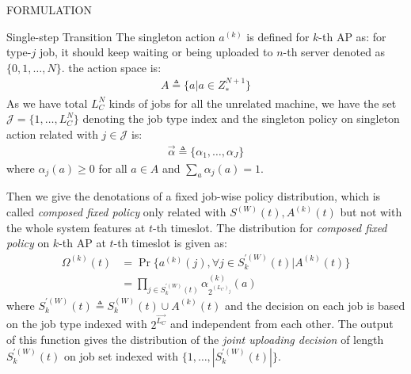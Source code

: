 \documentclass[10pt, conference, letterpaper]{IEEEtran}
\begin{document}
\begin{section}{FORMULATION}
\begin{subsection}{Single-step Transition}
            The singleton action $a^{(k)}$ is defined for $k$-th AP as: for type-$j$ job, it should keep waiting or being uploaded to $n$-th server denoted as $\{0,1,\dots,N\}$. the action space is:
            \begin{align}
                A \triangleq \{a|a \in Z_*^{N+1}\}
            \end{align}
            As we have total $L_C^{N}$ kinds of jobs for all the unrelated machine, we have the set $\mathcal{J}=\{1, \dots, L_C^{N}\}$ denoting the job type index and the singleton policy on singleton action related with $j \in \mathcal{J}$ is:
            \begin{align}
                \vec{\alpha} \triangleq \{\alpha_1,\dots,\alpha_J\}
            \end{align}
            where $\alpha_j(a) \geq 0$ for all $a \in A$ and $\sum_a \alpha_j(a) = 1$.

            Then we give the denotations of a fixed job-wise policy distribution, which is called \emph{composed fixed policy} only related with $S^{(W)}(t), A^{(k)}(t)$ but not with the whole system features at $t$-th timeslot. The distribution for \emph{composed fixed policy} on $k$-th AP at $t$-th timeslot is given as:
            \begin{align}
                \Omega^{(k)}(t) &= \Pr\{a^{(k)}(j), \forall j \in S^{'(W)}_k(t) | A^{(k)}(t)\}
                \nonumber\\
                &= \prod_{j \in S^{'(W)}_k(t)} \alpha_{2^{(L_C)_j}}^{(k)}(a)
            \end{align}
            where $S^{'(W)}_k(t) \triangleq S^{(W)}_k(t) \cup A^{(k)}(t)$ and the decision on each job is based on the job type indexed with $2^{\vec{L_C}}$ and independent from each other. The output of this function gives the distribution of the \emph{joint uploading decision} of length $S^{'(W)}_k(t)$ on job set indexed with $\{1,\dots,|S^{'(W)}_k(t)|\}$.


\end{subsection}
\end{section}
\end{document}

